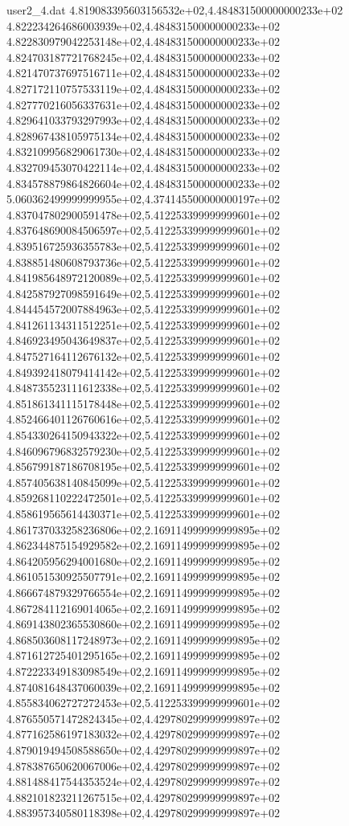\begin{filecontents}{user2_4.dat}
4.819083395603156532e+02,4.484831500000000233e+02
4.822234264686003939e+02,4.484831500000000233e+02
4.822830979042253148e+02,4.484831500000000233e+02
4.824703187721768245e+02,4.484831500000000233e+02
4.821470737697516711e+02,4.484831500000000233e+02
4.827172110757533119e+02,4.484831500000000233e+02
4.827770216056337631e+02,4.484831500000000233e+02
4.829641033793297993e+02,4.484831500000000233e+02
4.828967438105975134e+02,4.484831500000000233e+02
4.832109956829061730e+02,4.484831500000000233e+02
4.832709453070422114e+02,4.484831500000000233e+02
4.834578879864826604e+02,4.484831500000000233e+02
5.060362499999999955e+02,4.374145500000000197e+02
4.837047802900591478e+02,5.412253399999999601e+02
4.837648690084506597e+02,5.412253399999999601e+02
4.839516725936355783e+02,5.412253399999999601e+02
4.838851480608793736e+02,5.412253399999999601e+02
4.841985648972120089e+02,5.412253399999999601e+02
4.842587927098591649e+02,5.412253399999999601e+02
4.844454572007884963e+02,5.412253399999999601e+02
4.841261134311512251e+02,5.412253399999999601e+02
4.846923495043649837e+02,5.412253399999999601e+02
4.847527164112676132e+02,5.412253399999999601e+02
4.849392418079414142e+02,5.412253399999999601e+02
4.848735523111612338e+02,5.412253399999999601e+02
4.851861341115178448e+02,5.412253399999999601e+02
4.852466401126760616e+02,5.412253399999999601e+02
4.854330264150943322e+02,5.412253399999999601e+02
4.846096796832579230e+02,5.412253399999999601e+02
4.856799187186708195e+02,5.412253399999999601e+02
4.857405638140845099e+02,5.412253399999999601e+02
4.859268110222472501e+02,5.412253399999999601e+02
4.858619565614430371e+02,5.412253399999999601e+02
4.861737033258236806e+02,2.169114999999999895e+02
4.862344875154929582e+02,2.169114999999999895e+02
4.864205956294001680e+02,2.169114999999999895e+02
4.861051530925507791e+02,2.169114999999999895e+02
4.866674879329766554e+02,2.169114999999999895e+02
4.867284112169014065e+02,2.169114999999999895e+02
4.869143802365530860e+02,2.169114999999999895e+02
4.868503608117248973e+02,2.169114999999999895e+02
4.871612725401295165e+02,2.169114999999999895e+02
4.872223349183098549e+02,2.169114999999999895e+02
4.874081648437060039e+02,2.169114999999999895e+02
4.855834062727272453e+02,5.412253399999999601e+02
4.876550571472824345e+02,4.429780299999999897e+02
4.877162586197183032e+02,4.429780299999999897e+02
4.879019494508588650e+02,4.429780299999999897e+02
4.878387650620067006e+02,4.429780299999999897e+02
4.881488417544353524e+02,4.429780299999999897e+02
4.882101823211267515e+02,4.429780299999999897e+02
4.883957340580118398e+02,4.429780299999999897e+02

\end{filecontents}
